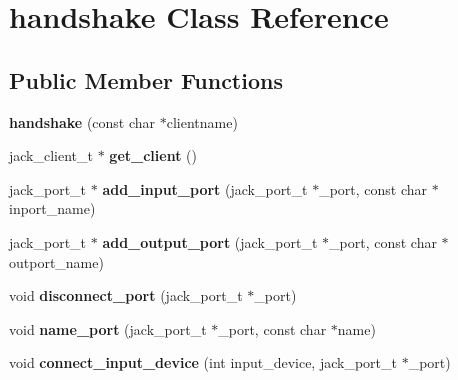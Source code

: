 \hypertarget{classhandshake}{}\section{handshake Class Reference}
\label{classhandshake}
\subsection*{Public Member Functions}
\begin{DoxyCompactItemize}
\item 
\mbox{\label{classhandshake_aec0b12c760a648e1b4fc40be11529a21}} 
{\bfseries handshake} (const char $\ast$clientname)
\item 
\mbox{\label{classhandshake_a1229342aa52da4b1d480d4791311b9d2}} 
jack\+\_\+client\+\_\+t $\ast$ {\bfseries get\+\_\+client} ()
\item 
\mbox{\label{classhandshake_af0ce8d96a76d8b157c73d40d4e5330de}} 
jack\+\_\+port\+\_\+t $\ast$ {\bfseries add\+\_\+input\+\_\+port} (jack\+\_\+port\+\_\+t $\ast$\+\_\+port, const char $\ast$inport\+\_\+name)
\item 
\mbox{\label{classhandshake_aa227451908beaa17890b582eda2d59f5}} 
jack\+\_\+port\+\_\+t $\ast$ {\bfseries add\+\_\+output\+\_\+port} (jack\+\_\+port\+\_\+t $\ast$\+\_\+port, const char $\ast$outport\+\_\+name)
\item 
\mbox{\label{classhandshake_a915e38ef7fe8687a3fc27b3a91986297}} 
void {\bfseries disconnect\+\_\+port} (jack\+\_\+port\+\_\+t $\ast$\+\_\+port)
\item 
\mbox{\label{classhandshake_a43d9fa50a21d39605ff67c1ab875ce2d}} 
void {\bfseries name\+\_\+port} (jack\+\_\+port\+\_\+t $\ast$\+\_\+port, const char $\ast$name)
\item 
\mbox{\label{classhandshake_abc2e38e9e6ab1cea8f2c12e258b4ccd0}} 
void {\bfseries connect\+\_\+input\+\_\+device} (int input\+\_\+device, jack\+\_\+port\+\_\+t $\ast$\+\_\+port)
\item 
\mbox{\label{classhandshake_a143f68691807234a419bc8fc552aacf9}} 

\end{DoxyCompactItemize}
